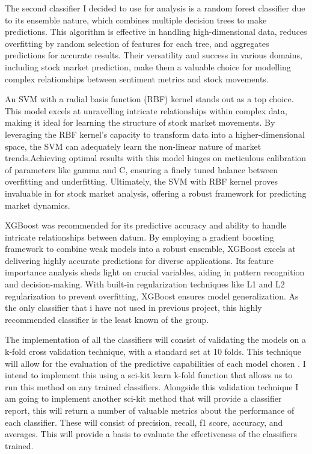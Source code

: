 \documentclass[11pt, a4paper]{article}
\begin{document}
The second classifier I decided to use for analysis is a random forest classifier due to its ensemble nature, which combines multiple decision trees to make predictions. This algorithm is effective in handling high-dimensional data, reduces overfitting by random selection of features for each tree, and aggregates predictions for accurate results. Their versatility and success in various domains, including stock market prediction, make them a valuable choice for modelling complex relationships between sentiment metrics and stock movements.

An SVM with a radial basis function (RBF) kernel stands out as a top choice. This model excels at unravelling intricate relationships within complex data, making it ideal for learning the structure of stock market movements. By leveraging the RBF kernel's capacity to transform data into a higher-dimensional space, the SVM can adequately learn the non-linear nature of market trends.Achieving optimal results with this model hinges on meticulous calibration of parameters like gamma and C, ensuring a finely tuned balance between overfitting and underfitting. Ultimately, the SVM with RBF kernel proves invaluable in for stock market analysis, offering a robust framework for predicting market dynamics.

XGBoost was recommended\cite{Twitter} for its predictive accuracy and ability to handle intricate relationships between datum. By employing a gradient boosting framework to combine weak models into a robust ensemble, XGBoost excels at delivering highly accurate predictions for diverse applications. Its feature importance analysis sheds light on crucial variables, aiding in pattern recognition and decision-making. With built-in regularization techniques like L1 and L2 regularization\cite{XGBoostRec} to prevent overfitting, XGBoost ensures model generalization. As the only classifier that i have not used in previous project, this highly recommended classifier is the least known  of the group.

The implementation of all the classifiers will consist of validating the models on a k-fold cross validation technique, with a standard set at 10 folds. This technique will allow for the evaluation of the predictive capabilities of each model chosen \cite{KFold}. I intend to implement this using a sci-kit learn k-fold function\cite{KFold2} that allows us to run this method on any trained classifiers. Alongside this validation technique I am going to implement another sci-kit method that will provide a classifier report, this will return a number of valuable metrics about the performance of each classifier. These will consist of precision, recall, f1 score, accuracy, and averages. This will provide a basis to evaluate the effectiveness of the classifiers trained.
\newpage
\end{document}
